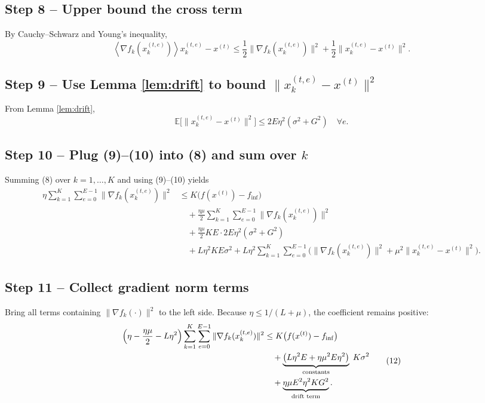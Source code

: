 \documentclass[11pt]{article}
\newcommand{\E}{\mathbb{E}}
\newcommand{\inner}[1]{\left\langle #1 \right\rangle}
\begin{document}
\subsection*{Step 8 – Upper bound the cross term}
By Cauchy–Schwarz and Young’s inequality,
\[
\inner{\nabla f_k(x_{k}^{(t,e)})}{x_{k}^{(t,e)}-x^{(t)}} 
\le \frac{1}{2}\|\nabla f_k(x_{k}^{(t,e)})\|^{2}+\frac{1}{2}\|x_{k}^{(t,e)}-x^{(t)}\|^{2}.
\tag{9}
\]

\subsection*{Step 9 – Use Lemma \ref{lem:drift} to bound $\|x_{k}^{(t,e)}-x^{(t)}\|^{2}$}
From Lemma \ref{lem:drift},
\[
\E\bigl[\|x_{k}^{(t,e)}-x^{(t)}\|^{2}\bigr]\le 2E\eta^{2}(\sigma^{2}+G^{2})\quad\forall e.
\tag{10}
\]

\subsection*{Step 10 – Plug (9)–(10) into (8) and sum over $k$}
Summing (8) over $k=1,\dots,K$ and using (9)–(10) yields
\[
\begin{aligned}
\eta\sum_{k=1}^{K}\sum_{e=0}^{E-1}\|\nabla f_k(x_{k}^{(t,e)})\|^{2}
&\le K\bigl(f(x^{(t)})-f_{\inf}\bigr) \\
&\quad + \frac{\eta\mu}{2}\sum_{k=1}^{K}\sum_{e=0}^{E-1}\|\nabla f_k(x_{k}^{(t,e)})\|^{2} \\
&\quad + \frac{\eta\mu}{2}K E \cdot 2E\eta^{2}(\sigma^{2}+G^{2}) \\
&\quad + L\eta^{2}K E\sigma^{2} + L\eta^{2}\sum_{k=1}^{K}\sum_{e=0}^{E-1}\bigl(\|\nabla f_k(x_{k}^{(t,e)})\|^{2}+ \mu^{2}\|x_{k}^{(t,e)}-x^{(t)}\|^{2}\bigr).
\end{aligned}
\tag{11}
\]

\subsection*{Step 11 – Collect gradient norm terms}
Bring all terms containing $\|\nabla f_k(\cdot)\|^{2}$ to the left side. Because $\eta\le 1/(L+\mu)$, the coefficient remains positive:
\[
\begin{aligned}
\Bigl(\eta -\frac{\eta\mu}{2} - L\eta^{2}\Bigr)
\sum_{k=1}^{K}\sum_{e=0}^{E-1}\|\nabla f_k(x_{k}^{(t,e)})\|^{2}
&\le K\bigl(f(x^{(t)})-f_{\inf}\bigr) \\
&\quad + \underbrace{\bigl(L\eta^{2}E + \eta\mu^{2}E\eta^{2}\bigr)}_{\text{constants}}\;K\sigma^{2} \\
&\quad + \underbrace{ \eta\mu E^{2}\eta^{2}K G^{2}}_{\text{drift term}} .
\end{aligned}
\tag{12}
\]
\end{document}
